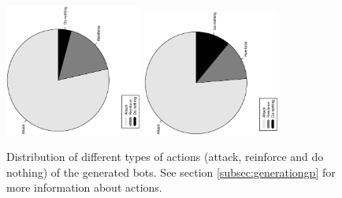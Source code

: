 \documentclass[conference]{IEEEtran}
\begin{document}
\begin{figure}[htb]
\tiny
\begin{center}


    \includegraphics[trim=1cm 7cm 1cm 5.8cm, clip=true,width=4.5cm,angle=-90]{./imags/distribution_initial_action.eps}
    \includegraphics[trim=1cm 7cm 1cm 6cm, clip=true,width=4.5cm,angle=-90]{./imags/distribution_final_action.eps}


\end{center}
\caption{Distribution of different types of actions (attack, reinforce and do nothing) of the generated bots. See section \ref{subsec:generationgp} for more information about actions.}
\label{figura:tarta_actions}
\end{figure}
\end{document}
